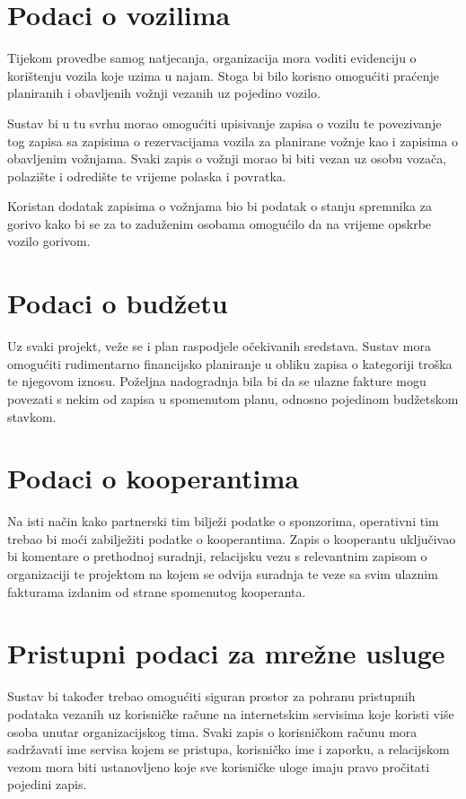 \documentclass[times, utf8, diplomski]{fer}
\begin{document}
\section{Podaci o vozilima}

Tijekom provedbe samog natjecanja, organizacija mora voditi evidenciju o
korištenju vozila koje uzima u najam. Stoga bi bilo korisno omogućiti praćenje
planiranih i obavljenih vožnji vezanih uz pojedino vozilo.

Sustav bi u tu svrhu morao omogućiti upisivanje zapisa o vozilu te povezivanje
tog zapisa sa zapisima o rezervacijama vozila za planirane vožnje kao i zapisima
o obavljenim vožnjama. Svaki zapis o vožnji morao bi biti vezan uz osobu vozača,
polazište i odredište te vrijeme polaska i povratka.

Koristan dodatak zapisima o vožnjama bio bi podatak o stanju spremnika za gorivo
kako bi se za to zaduženim osobama omogućilo da na vrijeme opskrbe vozilo
gorivom.

\section{Podaci o budžetu}

Uz svaki projekt, veže se i plan raspodjele očekivanih sredstava. Sustav mora
omogućiti rudimentarno financijsko planiranje u obliku zapisa o kategoriji
troška te njegovom iznosu. Poželjna nadogradnja bila bi da se ulazne fakture
mogu povezati s nekim od zapisa u spomenutom planu, odnosno pojedinom budžetskom
stavkom.

\section{Podaci o kooperantima}

Na isti način kako partnerski tim bilježi podatke o sponzorima, operativni tim
trebao bi moći zabilježiti podatke o kooperantima. Zapis o kooperantu uključivao
bi komentare o prethodnoj suradnji, relacijsku vezu s relevantnim zapisom o
organizaciji te projektom na kojem se odvija suradnja te veze sa svim ulaznim
fakturama izdanim od strane spomenutog kooperanta.

\section{Pristupni podaci za mrežne usluge} \label{credential_problem}

Sustav bi također trebao omogućiti siguran prostor za pohranu pristupnih
podataka vezanih uz korisničke račune na internetskim servisima koje koristi
više osoba unutar organizacijskog tima. Svaki zapis o korisničkom računu mora
sadržavati ime servisa kojem se pristupa, korisničko ime i zaporku, a
relacijskom vezom mora biti ustanovljeno koje sve korisničke uloge imaju pravo
pročitati pojedini zapis.
\end{document}
